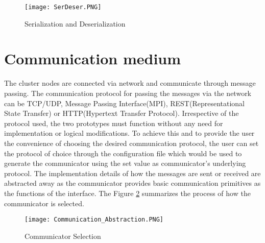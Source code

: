 \begin{figure}[!t]
\centering
\texttt{[image: SerDeser.PNG]}
\caption{Serialization and Deserialization}
\label{fig:SerDeser}
\end{figure}

\section{Communication medium}

The cluster nodes are connected via network and communicate through message passing. The communication protocol for passing the messages via the network can be TCP/UDP, Message Passing Interface(MPI), REST(Representational State Transfer) or HTTP(Hypertext Transfer Protocol). Irrespective of the protocol used, the two prototypes must function without any need for implementation or logical modifications. To achieve this and to provide the user the convenience of choosing the desired communication protocol, the user can set the protocol of choice through the configuration file which would be used to generate the communicator using the set value as communicator's underlying protocol. The implementation details of how the messages are sent or received are abstracted away as the communicator provides basic communication primitives as the functions of the interface. The Figure \ref{fig:CommAbs} summarizes the process of how the communicator is selected.

\begin{figure}[!t]
\centering
\texttt{[image: Communication\_Abstraction.PNG]}
\caption{Communicator Selection}
\label{fig:CommAbs}
\end{figure}

  